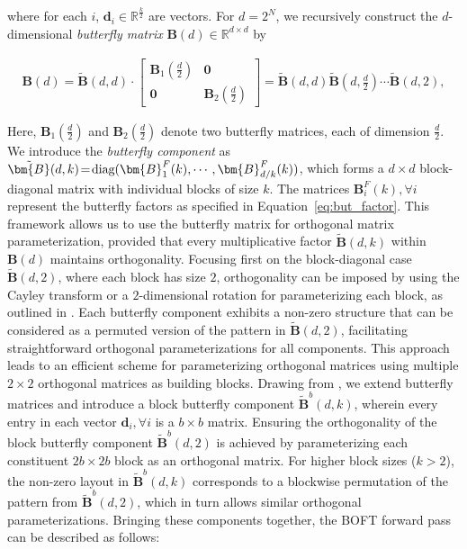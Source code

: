 where for each $i$, $\bm{d}_i\in\mathbb{R}^{\frac{k}{2}}$ are vectors. For $d=2^N$, we recursively construct the $d$-dimensional \emph{butterfly matrix} $\bm{B}(d)\in\mathbb{R}^{d\times d}$ by

\begin{equation}
\begin{aligned}
    \!\!\bm{B}(d)=\tilde{\bm{B}}(d,d)\!\cdot\!\begin{bmatrix}
    \bm{B}_1(\frac{d}{2})\!\!\!\!\! & \bm{0} \\
    \bm{0}\!\!\!\!\! &\bm{B}_2(\frac{d}{2})
    \end{bmatrix}= \tilde{\bm{B}}(d,d)\tilde{\bm{B}}(d,\frac{d}{2})\cdots\tilde{\bm{B}}(d,2),
\end{aligned}
\end{equation}

Here, $\bm{B}_1(\frac{d}{2})$ and $\bm{B}_2(\frac{d}{2})$ denote two butterfly matrices, each of dimension $\frac{d}{2}$. We introduce the \emph{butterfly component} as $\thickmuskip=2mu \medmuskip=2mu \tilde{\bm{B}}(d,k)=\text{diag}(\bm{B}^F_1(k),\cdots,\bm{B}^F_{d/k}(k))$, which forms a $d\times d$ block-diagonal matrix with individual blocks of size $k$. The matrices $\bm{B}^F_i(k),\forall i$ represent the butterfly factors as specified in Equation~\ref{eq:but_factor}. This framework allows us to use the butterfly matrix for orthogonal matrix parameterization, provided that every multiplicative factor $\tilde{\bm{B}}(d,k)$ within $\bm{B}(d)$ maintains orthogonality. Focusing first on the block-diagonal case $\tilde{\bm{B}}(d,2)$, where each block has size $2$, orthogonality can be imposed by using the Cayley transform or a $2$-dimensional rotation for parameterizing each block, as outlined in \cite{liu2021orthogonal,qiu2023controlling}. Each butterfly component exhibits a non-zero structure that can be considered as a permuted version of the pattern in $\tilde{\bm{B}}(d,2)$, facilitating straightforward orthogonal parameterizations for all components. This approach leads to an efficient scheme for parameterizing orthogonal matrices using multiple $2\times 2$ orthogonal matrices as building blocks. Drawing from \cite{chen2022pixelated}, we extend butterfly matrices and introduce a block butterfly component $\tilde{\bm{B}}^b(d,k)$, wherein every entry in each vector $\bm{d}_i,\forall i$ is a $b\times b$ matrix. Ensuring the orthogonality of the block butterfly component $\tilde{\bm{B}}^b(d,2)$ is achieved by parameterizing each constituent $2b\times 2b$ block as an orthogonal matrix. For higher block sizes ($k>2$), the non-zero layout in $\tilde{\bm{B}}^b(d,k)$ corresponds to a blockwise permutation of the pattern from $\tilde{\bm{B}}^b(d,2)$, which in turn allows similar orthogonal parameterizations. Bringing these components together, the BOFT forward pass can be described as follows:

